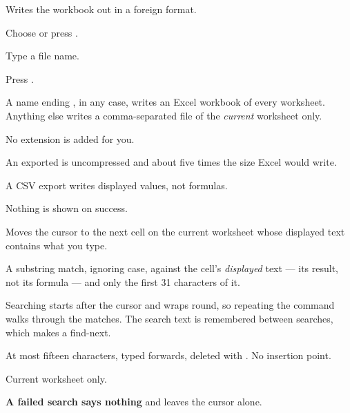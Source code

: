 
Writes the workbook out in a foreign format.

\begin{ccprocedure}[]
\item Choose  or press .
\item Type a file name.
\item Press .
\end{ccprocedure}

\begin{ccsteps}
\item A name ending , in any case, writes an Excel workbook of
every worksheet. Anything else writes a comma-separated file of the
\emph{current} worksheet only.
\item No extension is added for you.
\item An exported  is uncompressed and about five times the size
Excel would write.
\item A CSV export writes displayed values, not formulas.
\item Nothing is shown on success.
\end{ccsteps}


Moves the cursor to the next cell on the current worksheet whose displayed text
contains what you type.

\begin{ccsteps}
\item A substring match, ignoring case, against the cell's \emph{displayed}
text --- its result, not its formula --- and only the first 31 characters of it.
\item Searching starts after the cursor and wraps round, so repeating the
command walks through the matches. The search text is remembered between
searches, which makes   a find-next.
\item At most fifteen characters, typed forwards, deleted with
. No insertion point.
\item Current worksheet only.
\item \textbf{A failed search says nothing} and leaves the cursor alone.
\end{ccsteps}


